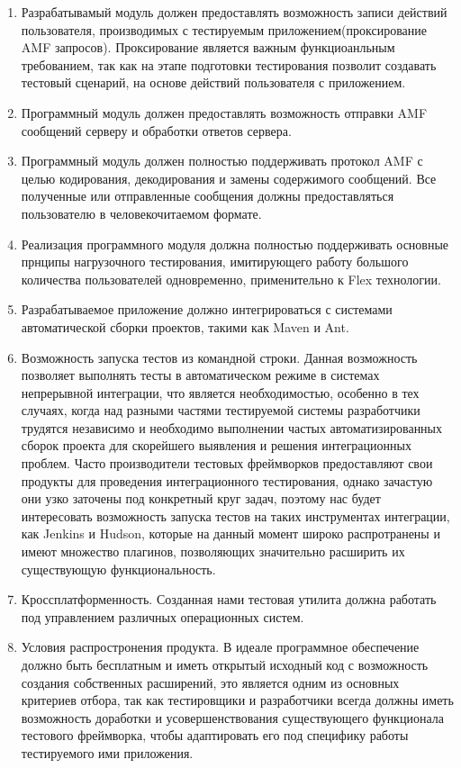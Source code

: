 \begin{enumerate}
\item Разрабатывамый модуль должен предоставлять возможность записи действий пользователя,
производимых с тестируемым приложением(проксирование AMF запросов). Проксирование является важным функциоанльным
требованием, так как на этапе подготовки тестирования позволит создавать тестовый сценарий, на основе действий
пользователя с приложением.
\item Программный модуль должен предоставлять возможность отправки AMF сообщений серверу и обработки ответов сервера.
\item Программный модуль должен полностью поддерживать протокол AMF с целью кодирования, декодирования и замены
содержимого сообщений. Все полученные или отправленные сообщения должны предоставляться пользователю в человекочитаемом
формате.
\item Реализация программного модуля должна полностью поддерживать основные прнципы нагрузочного тестирования,
имитирующего работу большого количества пользователей одновременно, применительно к Flex технологии.
\item Разрабатываемое приложение должно интегрироваться с системами автоматической сборки проектов, такими как Maven и Ant.
\item Возможность запуска тестов из командной строки. Данная возможность позволяет
выполнять тесты в автоматическом режиме в системах непрерывной интеграции, что
является необходимостью, особенно в тех случаях, когда над разными частями
тестируемой системы разработчики трудятся независимо и необходимо
выполнении частых автоматизированных сборок проекта для скорейшего
выявления и решения интеграционных проблем. Часто производители тестовых
фреймворков предоставляют свои продукты для проведения интеграционного тестирования, однако
зачастую они узко заточены под конкретный круг задач, поэтому нас будет интересовать
возможность запуска тестов на таких инструментах интеграции, как Jenkins и
Hudson, которые на данный момент широко распротранены и имеют множество плагинов, позволяющих
значительно расширить их существующую функциональность.
\item Кроссплатформенность. Созданная нами тестовая утилита должна работать
под управлением различных операционных систем.
\item Условия распростронения продукта. В идеале программное обеспечение должно быть
бесплатным и иметь открытый исходный код с возможность создания собственных расширений,
это является одним из основных критериев отбора, так как тестировщики и разработчики
всегда должны иметь возможность доработки и усовершенствования существующего функционала
тестового фреймворка, чтобы адаптировать его под специфику работы тестируемого ими приложения.
\end{enumerate}

